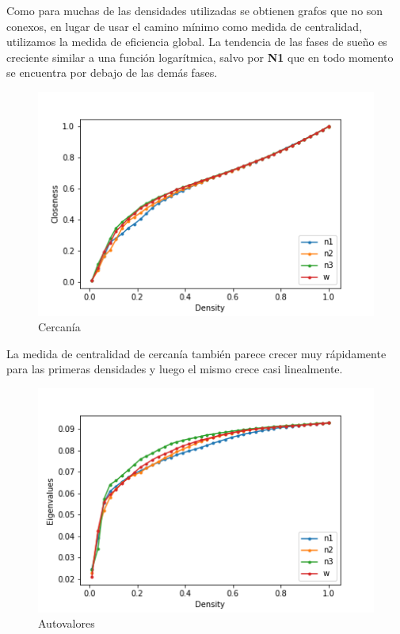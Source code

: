 Como para muchas de las densidades utilizadas se obtienen grafos que no son conexos, en lugar de usar el camino mínimo como medida de centralidad, utilizamos la medida de eficiencia global. La tendencia de las fases de sueño es creciente similar a una función logarítmica, salvo por \textbf{N1} que en todo momento se encuentra por debajo de las demás fases.

\begin{figure}[H]
    \centering
    \includegraphics[width = 6in]{img/closeness.png}
    \caption{Cercanía}
    \label{fig:closeness}
\end{figure}

La medida de centralidad de cercanía también parece crecer muy rápidamente para las primeras densidades y luego el mismo crece casi linealmente.

\begin{figure}[H]
    \centering
    \includegraphics[width = 6in]{img/eigenvector.png}
    \caption{Autovalores}
    \label{fig:eigen}
\end{figure}

